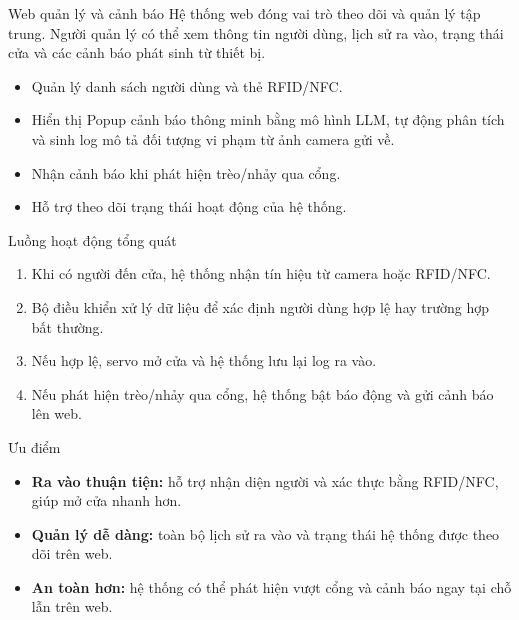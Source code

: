 \documentclass[aspectratio=169]{beamer}
\begin{document}
\begin{frame}{Web quản lý và cảnh báo}
  Hệ thống web đóng vai trò theo dõi và quản lý tập trung. Người quản lý có thể xem thông tin người dùng, lịch sử ra vào, trạng thái cửa và các cảnh báo phát sinh từ thiết bị.

  \vspace{0.8em}
  \begin{itemize}
    \item Quản lý danh sách người dùng và thẻ RFID/NFC.
    \item Hiển thị Popup cảnh báo thông minh bằng mô hình LLM, tự động phân tích và sinh log mô tả đối tượng vi phạm từ ảnh camera gửi về.
    \item Nhận cảnh báo khi phát hiện trèo/nhảy qua cổng.
    \item Hỗ trợ theo dõi trạng thái hoạt động của hệ thống.
  \end{itemize}
\end{frame}

\begin{frame}{Luồng hoạt động tổng quát}
  \begin{enumerate}
    \item Khi có người đến cửa, hệ thống nhận tín hiệu từ camera hoặc RFID/NFC.
    \item Bộ điều khiển xử lý dữ liệu để xác định người dùng hợp lệ hay trường hợp bất thường.
    \item Nếu hợp lệ, servo mở cửa và hệ thống lưu lại log ra vào.
    \item Nếu phát hiện trèo/nhảy qua cổng, hệ thống bật báo động và gửi cảnh báo lên web.
  \end{enumerate}
\end{frame}

\begin{frame}{Ưu điểm}
  \begin{itemize}
    \item \textbf{Ra vào thuận tiện:} hỗ trợ nhận diện người và xác thực bằng RFID/NFC, giúp mở cửa nhanh hơn.
    \vspace{0.4em}
    \item \textbf{Quản lý dễ dàng:} toàn bộ lịch sử ra vào và trạng thái hệ thống được theo dõi trên web.
    \vspace{0.4em}
    \item \textbf{An toàn hơn:} hệ thống có thể phát hiện vượt cổng và cảnh báo ngay tại chỗ lẫn trên web.
  \end{itemize}
\end{frame}
\end{document}
